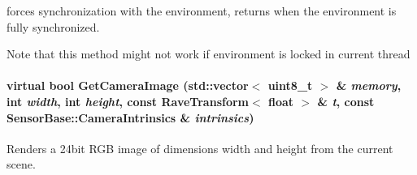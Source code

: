 forces synchronization with the environment, returns when the environment is fully synchronized. 

Note that this method might not work if environment is locked in current thread \hypertarget{classOpenRAVE_1_1ViewerBase_ad149822b9f25bf1adf3d76e78379cca5}{
\paragraph[{GetCameraImage}]{\setlength{\rightskip}{0pt plus 5cm}virtual bool GetCameraImage (std::vector$<$ uint8\_\-t $>$ \& {\em memory}, \/  int {\em width}, \/  int {\em height}, \/  const RaveTransform$<$ float $>$ \& {\em t}, \/  const {\bf SensorBase::CameraIntrinsics} \& {\em intrinsics})}\hfill}
\label{classOpenRAVE_1_1ViewerBase_ad149822b9f25bf1adf3d76e78379cca5}


Renders a 24bit RGB image of dimensions width and height from the current scene. 

